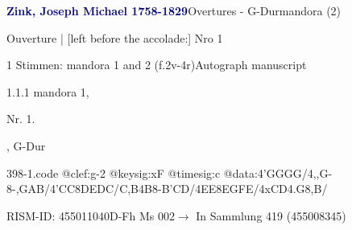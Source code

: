 \documentclass[twocolumn, 12pt]{book}
\begin{document}
\par \vspace{16pt} \textcolor{darkblue}{\textbf{Zink, Joseph Michael  1758-1829}}\hfillplus{\textbf{[398]}}\newline Overtures - G-Dur\newline mandora (2)
\par \begin{itshape} Ouverture | [left before the accolade:] Nro 1\end{itshape} 
\par \textcolor{darkblue}{}  1 Stimmen: mandora 1 and 2  (f.2v-4r)\newline Autograph manuscript
\par 1.1.1  mandora 1, \begin{itshape}Nr. 1.\end{itshape}, G-Dur  
\begin{filecontents*}{398-1.code}
@clef:g-2
@keysig:xF
@timesig:c
@data:4'GGGG/4,,G-8-{,GAB}/4'CC8DEDC/{C,B}4B8-{B'C}D/4EE{8EG}{FE}/4xCD4.G8,B/
\end{filecontents*}
\newline %
\par RISM-ID: 455011040\newline D-Fh  Ms 002\newline $\rightarrow$ In Sammlung 419 (455008345)
      
\end{document}
